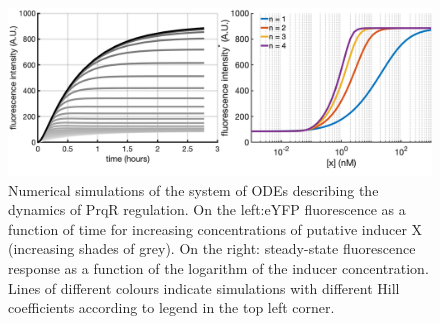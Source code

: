\begin{figure}[H]
    \centering
    \includegraphics[width=\hsize]{figs/simulations.png}
    \caption{Numerical simulations of the system of ODEs describing the dynamics of PrqR regulation. On the left:eYFP fluorescence as a function of time for increasing concentrations of putative inducer X (increasing shades of grey). On the right: steady-state fluorescence response as a function of the logarithm of the inducer concentration. Lines of different colours indicate simulations with different Hill coefficients according to legend in the top left corner.}
    \label{fig:modelgraphs}
    \end{figure}
